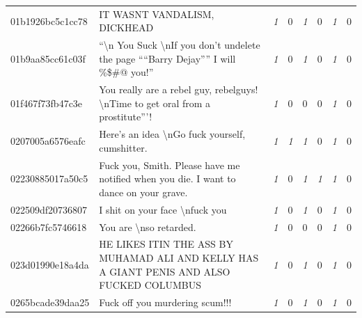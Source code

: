 \begin{table}[htb!]
{\begin{minipage}{0.88\textheight}
\begin{threeparttable}
\begin{tabularx}{\textwidth}{L{0.95} L{6.25} C{0.135} C{0.135} C{0.135} C{0.135} C{0.135} C{0.135}}
                    01b1926bc5c1cc78 & IT WASNT VANDALISM, DICKHEAD                                                                                                     & \textit{1}  & 0           & \textit{1}  & 0           & \textit{1}  & 0           \\
                    01b9aa85cc61c03f & ``\textbackslash n You Suck \textbackslash nIf you don't undelete the page ````Barry Dejay'''' I will \%\$\#@ you!''             & \textit{1}  & 0           & \textit{1}  & 0           & \textit{1}  & 0           \\
                    01f467f73fb47c3e & You really are a rebel guy, rebelguys! \textbackslash nTime to get oral from a prostitute'''!                                    & \textit{1}  & 0           & 0           & 0           & \textit{1}  & 0           \\
                    0207005a6576eafc & Here's an idea \textbackslash nGo fuck yourself, cumshitter.                                                                     & \textit{1}  & \textit{1}  & \textit{1}  & 0           & \textit{1}  & 0           \\
                    02230885017a50c5 & Fuck you, Smith. Please have me notified when you die. I want to dance on your grave.                                            & \textit{1}  & 0           & \textit{1}  & \textit{1}  & \textit{1}  & 0           \\
                    022509df20736807 & I shit on your face \textbackslash nfuck you                                                                                     & \textit{1}  & 0           & \textit{1}  & 0           & \textit{1}  & 0           \\
                    02266b7fc5746618 & You are \textbackslash nso retarded.                                                                                             & \textit{1}  & 0           & 0           & 0           & \textit{1}  & 0           \\
                    023d01990e18a4da & HE LIKES ITIN THE ASS BY MUHAMAD ALI AND KELLY HAS A GIANT PENIS AND ALSO FUCKED COLUMBUS                                        & \textit{1}  & 0           & \textit{1}  & 0           & \textit{1}  & 0           \\
                    0265bcade39daa25 & Fuck off you murdering scum!!!                                                                                                   & \textit{1}  & 0           & \textit{1}  & 0           & \textit{1}  & 0           \\

\end{tabularx}
\end{threeparttable}
\end{minipage}}
\end{table}
